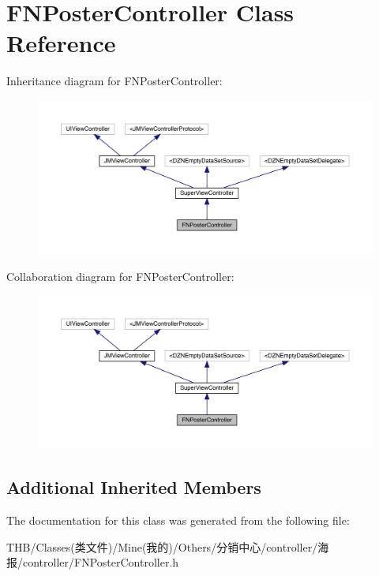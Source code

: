\hypertarget{interface_f_n_poster_controller}{}\section{F\+N\+Poster\+Controller Class Reference}
\label{interface_f_n_poster_controller}


Inheritance diagram for F\+N\+Poster\+Controller\+:\nopagebreak
\begin{figure}[H]
\begin{center}
\leavevmode
\includegraphics[width=350pt]{interface_f_n_poster_controller__inherit__graph}
\end{center}
\end{figure}


Collaboration diagram for F\+N\+Poster\+Controller\+:\nopagebreak
\begin{figure}[H]
\begin{center}
\leavevmode
\includegraphics[width=350pt]{interface_f_n_poster_controller__coll__graph}
\end{center}
\end{figure}
\subsection*{Additional Inherited Members}


The documentation for this class was generated from the following file\+:\begin{DoxyCompactItemize}
\item 
T\+H\+B/\+Classes(类文件)/\+Mine(我的)/\+Others/分销中心/controller/海报/controller/F\+N\+Poster\+Controller.\+h\end{DoxyCompactItemize}
